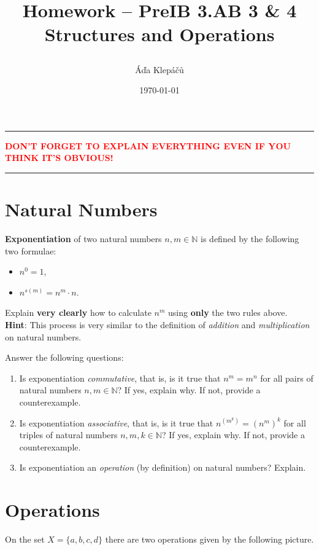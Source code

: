 \documentclass[a4paper,11pt]{article}
\title{\Huge\textsf{Homework -- PreIB 3.AB 3 \& 4}\\
 \Large\textsf{Structures and Operations}
 \author{Áďa Klepáčů}
 \date{\today}
}
\newcommand{\N}{\mathbb{N}}
\newcommand{\clr}{\textcolor{red}}
\begin{document}
\maketitle
\thispagestyle{fancy}

\begin{center}
 \hrule
 \textbf{\clr{DON'T FORGET TO EXPLAIN EVERYTHING EVEN IF YOU THINK IT'S
 OBVIOUS!}}
 \vspace{2ex}
 \hrule
\end{center}
 
\section*{Natural Numbers}

\textbf{Exponentiation} of two natural numbers $n,m \in \N$ is defined by the
following two formulae:
\begin{itemize}
 \item $n^{0} = 1$,
 \item $n^{s(m)} = n^{m} \cdot n$.
\end{itemize}
Explain \textbf{very clearly} how to calculate $n^{m}$ using \textbf{only} the
two rules above.\\
\textbf{Hint}: This process is very similar to the definition of \emph{addition}
and \emph{multiplication} on natural numbers.

Answer the following questions:
\begin{enumerate}
 \item Is exponentiation \emph{commutative}, that is, is it true that $n^{m} =
  m^{n}$ for all pairs of natural numbers $n,m \in \N$? If yes, explain why. If
  not, provide a counterexample.
 \item Is exponentiation \emph{associative}, that is, is it true that
  $n^{(m^{k})} = (n^{m})^{k}$ for all triples of natural numbers $n,m,k \in \N$?
  If yes, explain why. If not, provide a counterexample.
 \item Is exponentiation an \emph{operation} (by definition) on natural numbers?
  Explain.
\end{enumerate}

\clearpage
\section*{Operations}

On the set $X = \{a,b,c,d\}$ there are two operations given by the following
picture.
\end{document}
